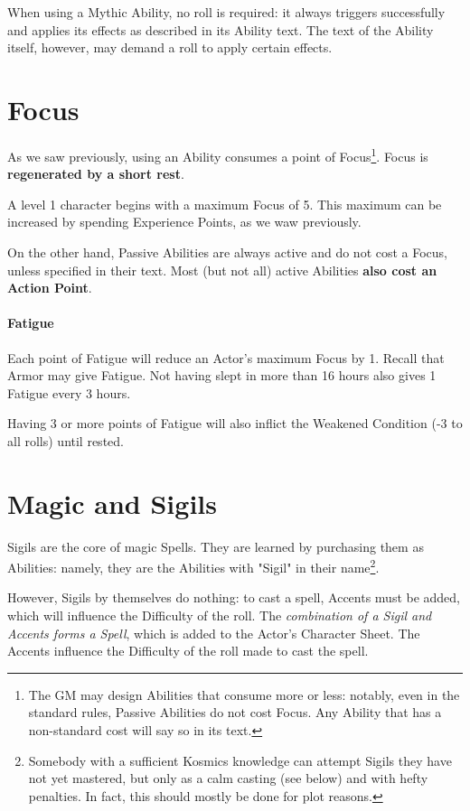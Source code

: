 When using a Mythic Ability, no roll is required: it always triggers successfully and applies its effects as described in its Ability text. The text of the Ability itself, however, may demand a roll to apply certain effects.


\section{Focus}
\label{resources}

As we saw previously, using an Ability consumes a point of Focus\footnote{The GM may design Abilities that consume more or less: notably, even in the standard rules, Passive Abilities do not cost Focus. Any Ability that has a non-standard cost will say so in its text.}. Focus is \textbf{regenerated by a short rest}. 

A level 1 character begins with a maximum Focus of 5. This maximum can be increased by spending Experience Points, as we waw previously. 

On the other hand, Passive Abilities are always active and do not cost a Focus, unless specified in their text. Most (but not all) active Abilities \textbf{also cost an Action Point}.

\paragraph{Fatigue}

Each point of Fatigue will reduce an Actor's maximum Focus by 1. Recall that Armor may give Fatigue. Not having slept in more than 16 hours also gives 1 Fatigue every 3 hours.

Having 3 or more points of Fatigue will also inflict the Weakened Condition (-3 to all rolls) until rested.



\section{Magic and Sigils}
\label{spells}


Sigils are the core of magic Spells. They are learned by purchasing them as Abilities: namely, they are the Abilities with "Sigil" in their name\footnote{Somebody with a sufficient Kosmics knowledge can attempt Sigils they have not yet mastered, but only as a calm casting (see below) and with hefty penalties. In fact, this should mostly be done for plot reasons.}. 

However, Sigils by themselves do nothing: to cast a spell, Accents must be added, which will influence the Difficulty of the roll. The \textit{combination of a Sigil and Accents forms a Spell}, which is added to the Actor's Character Sheet. The Accents influence the Difficulty of the roll made to cast the spell.

